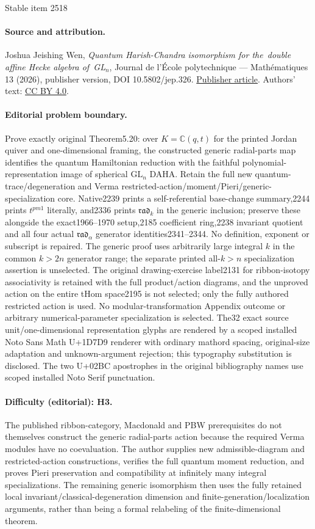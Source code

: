 \documentclass[11pt]{article}
\theoremstyle{definition}
\begin{document}
\begin{center}{\Large Stable item 2518}\end{center}
\paragraph{Source and attribution.}
Joshua Jeishing Wen, \emph{Quantum Harish-Chandra isomorphism for the double affine Hecke algebra of GL$_n$}, Journal de l’École polytechnique — Mathématiques 13 (2026), publisher version, DOI 10.5802/jep.326. \href{https://jep.centre-mersenne.org/articles/10.5802/jep.326/}{Publisher article}. Authors' text: \href{https://creativecommons.org/licenses/by/4.0/}{CC BY 4.0}.
\paragraph{Editorial problem boundary.}
Prove exactly original Theorem5.20: over $K=\mathbb C(q,t)$ for the printed Jordan quiver and one-dimensional framing, the constructed generic radial-parts map identifies the quantum Hamiltonian reduction with the faithful polynomial-representation image of spherical $\mathrm{GL}_n$ DAHA. Retain the full new quantum-trace/degeneration and Verma restricted-action/moment/Pieri/generic-specialization core. Native2239 prints a self-referential base-change summary,2244 prints $t^{pm 1}$ literally, and2336 prints $\mathfrak{rad}_k$ in the generic inclusion; preserve these alongside the exact1966--1970 setup,2185 coefficient ring,2238 invariant quotient and all four actual $\mathfrak{rad}_\alpha$ generator identities2341--2344. No definition, exponent or subscript is repaired. The generic proof uses arbitrarily large integral $k$ in the common $k>2n$ generator range; the separate printed all-$k>n$ specialization assertion is unselected. The original drawing-exercise label2131 for ribbon-isotopy associativity is retained with the full product/action diagrams, and the unproved action on the entire tHom space2195 is not selected; only the fully authored restricted action is used. No modular-transformation Appendix outcome or arbitrary numerical-parameter specialization is selected. The32 exact source unit/one-dimensional representation glyphs are rendered by a scoped installed Noto Sans Math U+1D7D9 renderer with ordinary mathord spacing, original-size adaptation and unknown-argument rejection; this typography substitution is disclosed. The two U+02BC apostrophes in the original bibliography names use scoped installed Noto Serif punctuation.
\paragraph{Difficulty (editorial): H3.}
The published ribbon-category, Macdonald and PBW prerequisites do not themselves construct the generic radial-parts action because the required Verma modules have no coevaluation. The author supplies new admissible-diagram and restricted-action constructions, verifies the full quantum moment reduction, and proves Pieri preservation and compatibility at infinitely many integral specializations. The remaining generic isomorphism then uses the fully retained local invariant/classical-degeneration dimension and finite-generation/localization arguments, rather than being a formal relabeling of the finite-dimensional theorem.
\end{document}
